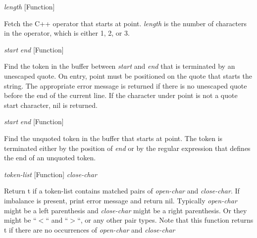 \vspace{1em}
\noindent
{}
\usebox{\funcname}\emph{length}
 \hfill [Function]

\begin{doc-string}
Fetch the C++ operator that starts at point.  \emph{length} is the number of characters
in the operator, which is either 1, 2, or 3.
\end{doc-string}

\vspace{1em}
\noindent
{}
\usebox{\funcname}\emph{start} \emph{end}
 \hfill [Function]

\begin{doc-string}
Find the token in the buffer between \emph{start} and \emph{end} that is terminated by an
unescaped quote.  On entry, point must be positioned on the quote that starts
the string.  The appropriate error message is returned if there is no unescaped
quote before the end of the current line.  If the character under point is not a
quote start character, nil is returned.
\end{doc-string}

\vspace{1em}
\noindent
{}
\usebox{\funcname}\emph{start} \emph{end}
 \hfill [Function]

\begin{doc-string}
Find the unquoted token in the buffer that starts at point.  The token is
terminated either by the position of \emph{end} or by the regular expression that
defines the end of an unquoted token.
\end{doc-string}

\vspace{1em}
\noindent
{}
\usebox{\funcname}\emph{token-list}
 \hfill [Function]
\hspace*{\wd\funcname}\emph{close-char}

\begin{doc-string}
Return t if a token-list contains matched pairs of \emph{open-char} and \emph{close-char}.
If imbalance is present, print error message and return nil.  Typically \emph{open-char}
might be a left parenthesis and \emph{close-char} might be a right parenthesis.  Or they
might be ``$<$`` and ``$>$``, or any other pair types.  Note that this function
returns t if there are no occurrences of \emph{open-char} and \emph{close-char}
\end{doc-string}


